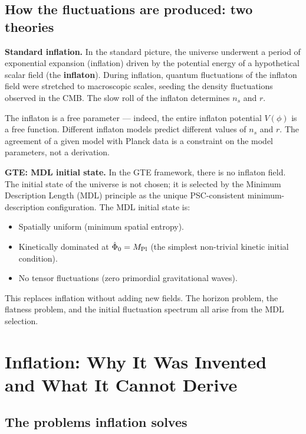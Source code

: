 \documentclass[11pt,a4paper]{article}
\newcommand{\term}[1]{\textbf{#1}}
\begin{document}
\subsection{How the fluctuations are produced: two theories}

\textbf{Standard inflation.}
In the standard picture, the universe underwent a period of exponential expansion
(inflation) driven by the potential energy of a hypothetical scalar field
(the \term{inflaton}).
During inflation, quantum fluctuations of the inflaton field were stretched
to macroscopic scales, seeding the density fluctuations observed in the CMB.
The slow roll of the inflaton determines $n_s$ and $r$.

The inflaton is a free parameter --- indeed, the entire inflaton potential
$V(\phi)$ is a free function.
Different inflaton models predict different values of $n_s$ and $r$.
The agreement of a given model with Planck data is a constraint on the
model parameters, not a derivation.

\textbf{GTE: MDL initial state.}
In the GTE framework, there is no inflaton field.
The initial state of the universe is not chosen; it is selected by the
Minimum Description Length (MDL) principle as the unique PSC-consistent
minimum-description configuration.
The MDL initial state is:
\begin{itemize}[itemsep=2pt]
  \item Spatially uniform (minimum spatial entropy).
  \item Kinetically dominated at $\dot{\Phi}_0 = M_{\rm Pl}$ (the simplest
        non-trivial kinetic initial condition).
  \item No tensor fluctuations (zero primordial gravitational waves).
\end{itemize}
This replaces inflation without adding new fields.
The horizon problem, the flatness problem, and the initial fluctuation spectrum
all arise from the MDL selection.

\section{Inflation: Why It Was Invented and What It Cannot Derive}
\label{sec:inflation}

\subsection{The problems inflation solves}
\end{document}
